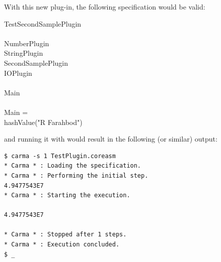\documentclass{article}
\begin{document}
With this new plug-in, the following \CoreASM specification would be valid:

\bExample
{} TestSecondSamplePlugin\\
\\
 NumberPlugin\\
 StringPlugin\\
 SecondSamplePlugin\\
 IOPlugin\\
\\
 Main\\
\\
 Main = \\
\tab {} hashValue("R Farahbod")\\
\eExample

\noindent and running it with \Carma would result in the following (or similar) output:

\begin{shell}
\begin{verbatim}
$ carma -s 1 TestPlugin.coreasm
* Carma * : Loading the specification.
* Carma * : Performing the initial step.
4.9477543E7
* Carma * : Starting the execution.

4.9477543E7

* Carma * : Stopped after 1 steps.
* Carma * : Execution concluded.
$ _
\end{verbatim}
\end{shell}
\end{document}

